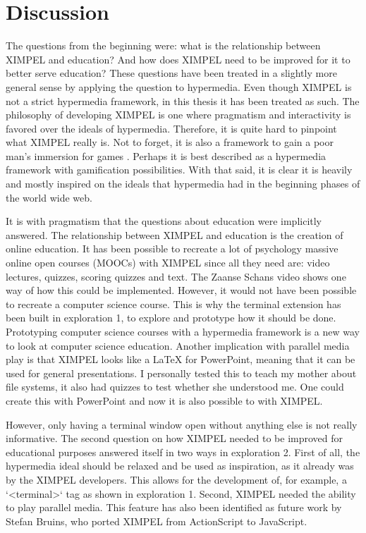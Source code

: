 \chapter{Discussion}

The questions from the beginning were: what is the relationship between XIMPEL and education? And how does XIMPEL need to be improved for it to better serve education? These questions have been treated in a slightly more general sense by applying the question to hypermedia. Even though XIMPEL is not a strict hypermedia framework, in this thesis it has been treated as such. The philosophy of developing XIMPEL is one where pragmatism and interactivity is favored over the ideals of hypermedia. Therefore, it is quite hard to pinpoint what XIMPEL really is. Not to forget, it is also a framework to gain a poor man's immersion for games \cite{eliens2007}. Perhaps it is best described as a hypermedia framework with gamification possibilities. With that said, it is clear it is heavily and mostly inspired on the ideals that hypermedia had in the beginning phases of the world wide web. 

It is with pragmatism that the questions about education were implicitly answered. The relationship between XIMPEL and education is the creation of online education. It has been possible to recreate a lot of psychology massive online open courses (MOOCs) with XIMPEL since all they need are: video lectures, quizzes, scoring quizzes and text. The Zaanse Schans video shows one way of how this could be implemented. However, it would not have been possible to recreate a computer science course. This is why the terminal extension has been built in exploration 1, to explore and prototype how it should be done. Prototyping computer science courses with a hypermedia framework is a new way to look at computer science education. Another implication with parallel media play is that XIMPEL looks like a LaTeX for PowerPoint, meaning that it can be used for general presentations. I personally tested this to teach my mother about file systems, it also had quizzes to test whether she understood me. One could create this with PowerPoint and now it is also possible to with XIMPEL.

However, only having a terminal window open without anything else is not really informative. The second question on how XIMPEL needed to be improved for educational purposes answered itself in two ways in exploration 2. First of all, the hypermedia ideal should be relaxed and be used as inspiration, as it already was by the XIMPEL developers. This allows for the development of, for example, a `<terminal>` tag as shown in exploration 1. Second, XIMPEL needed the ability to play parallel media. This feature has also been identified as future work by Stefan Bruins, who ported XIMPEL from ActionScript to JavaScript. 


